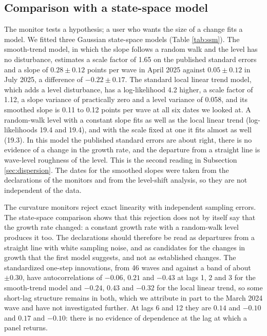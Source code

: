 \documentclass[Afour,sageh,times]{sagej}
\theoremstyle{definition}
\begin{document}
\subsection{Comparison with a state-space model}
\label{sec:ssm}

\begin{table}[t]
\small\centering
\caption{State-space models for the legacy and revised waves with the published standard errors multiplied by an estimated common factor (scale) and a level intervention at the wording change, fitted by maximum likelihood; slopes are in points per wave, with 95 percent half-widths. The log-likelihoods are comparable across rows (diffuse initial states). Slope var. and level var. are the innovation variances per wave.}
\label{tab:ssm}

\end{table}

The monitor tests a hypothesis; a user who wants the size of a change fits a model. We fitted three Gaussian state-space models (Table \ref{tab:ssm}). The smooth-trend model, in which the slope follows a random walk and the level has no disturbance, estimates a scale factor of 1.65 on the published standard errors and a slope of $0.28 \pm 0.12$ points per wave in April 2025 against $0.05 \pm 0.12$ in July 2025, a difference of $-0.22 \pm 0.17$. The standard local linear trend model, which adds a level disturbance, has a log-likelihood 4.2 higher, a scale factor of 1.12, a slope variance of practically zero and a level variance of 0.058, and its smoothed slope is 0.11 to 0.12 points per wave at all six dates we looked at. A random-walk level with a constant slope fits as well as the local linear trend (log-likelihoods 19.4 and 19.4), and with the scale fixed at one it fits almost as well (19.3). In this model the published standard errors are about right, there is no evidence of a change in the growth rate, and the departure from a straight line is wave-level roughness of the level. This is the second reading in Subsection \ref{sec:dispersion}. The dates for the smoothed slopes were taken from the declarations of the monitors and from the level-shift analysis, so they are not independent of the data.

The curvature monitors reject exact linearity with independent sampling errors. The state-space comparison shows that this rejection does not by itself say that the growth rate changed: a constant growth rate with a random-walk level produces it too. The declarations should therefore be read as departures from a straight line with white sampling noise, and as candidates for the changes in growth that the first model suggests, and not as established changes. The standardized one-step innovations, from 46 waves and against a band of about $\pm 0.30$, have autocorrelations of $-0.06$, $0.21$ and $-0.43$ at lags 1, 2 and 3 for the smooth-trend model and $-0.24$, $0.43$ and $-0.32$ for the local linear trend, so some short-lag structure remains in both, which we attribute in part to the March 2024 wave and have not investigated further. At lags 6 and 12 they are $0.14$ and $-0.10$ and $0.17$ and $-0.10$: there is no evidence of dependence at the lag at which a panel returns.
\end{document}
